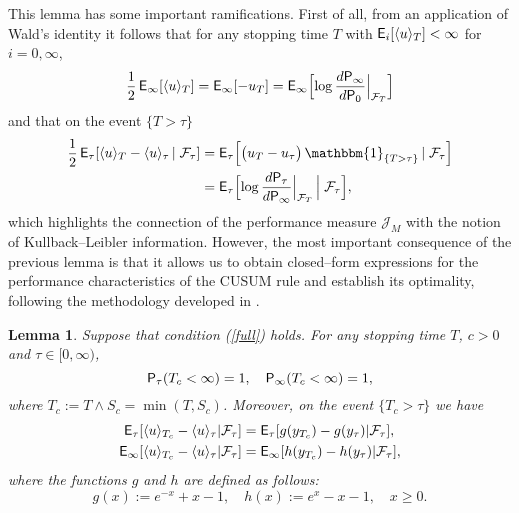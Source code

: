 \documentclass[11pt,reqno]{amsart}
\newtheorem{lemma}[theorem]{Lemma}
\theoremstyle{remark}
\begin{document}
This  lemma has some important ramifications. First of all, from an application of Wald's identity it follows that for any stopping time $T$ with   ${{\sf E}}_{i}[\langle u \rangle_{T}]<\infty$ for $i=0,\infty$,
 \begin{equation} \label{klfap}
\frac{1}{2} \, {{\sf E}}_{\infty}[\langle u \rangle_{T}] = {{\sf E}}_{\infty} [ - u_{T}]= {{\sf E}}_{\infty} \Bigl[ \log \frac{d{{\sf P}}_{\infty}}{d{{\sf P}}_{0}}\Big|_{{\mathcal{F}}_{T}} \Bigr]
\end{equation}
and that on the event $\{{T} > \tau\}$ 
\begin{align} \label{kldel}
\begin{split}
\frac{1}{2}  \,  {{\sf E}}_{\tau}[\langle u \rangle_{T}-\langle u \rangle_{\tau}  \, | \; {\mathcal{F}}_{\tau}] 
&= {{\sf E}}_{\tau} \Bigl[\bigl( u_{T}- u_{\tau} \bigr) \, {\mathbbm{1}_{\{{{T} > \tau}\}}}  \, | \; {\mathcal{F}}_{\tau} \Bigr] \\
&= {{\sf E}}_{\tau} \Bigl[ \log \frac{d{{\sf P}}_{\tau}}{d{{\sf P}}_{\infty}}\Big|_{{\mathcal{F}}_{T}}  \, \Big| \; {\mathcal{F}}_{\tau} \Bigr],
\end{split}
\end{align}
which highlights the connection of the performance measure ${\mathcal{J}}_{M}$  with the notion of Kullback--Leibler information. However, the most important consequence of the previous lemma is that it allows us to  obtain closed--form expressions for the performance characteristics of the CUSUM rule and establish its optimality,
following the methodology developed in \cite{moustito}. 

\begin{lemma} \label{L1}
Suppose that condition (\ref{full}) holds. For any stopping time $T$, $c>0$ and $\tau \in [0,\infty)$, 
\begin{equation} \label{fin}
{{\sf P}}_{\tau}({T_{c}}<\infty)=1, \quad {{\sf P}}_{\infty}({T_{c}}<\infty)=1,
\end{equation}
where ${T_{c}}:={T} \wedge {S_{c}} = \min({T},{S_{c}})$. Moreover, on the event $\{{T_{c}} > \tau\}$ we have
\begin{align} \label{perf}
\begin{split}
{{\sf E}}_{\tau}[\langle u \rangle_{T_{c}} - \langle u \rangle_{\tau} |{\mathcal{F}}_{\tau}] &= {{\sf E}}_{\tau}[g(y_{T_{c}})-g(y_{\tau})| {\mathcal{F}}_{\tau}] , \\
{{\sf E}}_{\infty}[\langle u \rangle_{T_{c}} - \langle u \rangle_{\tau} | {\mathcal{F}}_{\tau}] &= {{\sf E}}_{\infty}[h(y_{T_{c}})-h(y_{\tau})| {\mathcal{F}}_{\tau}],
\end{split}
\end{align}
where the functions $g$ and $h$ are defined  as follows:
\begin{equation} \label{gh}
g(x) :=e^{-x}+x-1, \quad  h(x):=e^{x}-x-1, \quad x \geq 0.
\end{equation}
\end{lemma}
\end{document}

